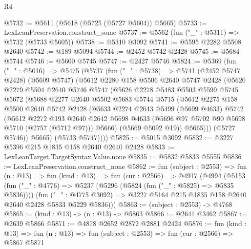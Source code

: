 \begin{lexlean}{R4}
\begin{coremodule}
@5732 := @5611 (@5618 (@5725 (@5727 @5604)) @5665)
@5733 := LexLeanPreservation.construct_some
@5737 := @5562 (fun ("_" : @5311) => @5732 (@5733 @5605))
@5738 := @5310 @3092
@5741 := @5595 @2282 @5508 @2640
@5742 := @189 @5094
@5744 := @2452 @5742 @2428
@5745 := @5684 @5744
@5746 := @5600 @5745
@5747 := @2427 @5746
@5824 := @5369
    (fun ("_" : @5016) =>
    @5475
      (@5737
        (fun ("_" : @5738) =>
        @5741
          (@2452 @5747 @2428)
          (@5609 @5747)
          (@5612
            @2280
            @158
            @5506
            @2640
            @5747
            @2428
            (@5620
              @2279
              @5504
              @2640
              @5746
              @5747
              (@5626
                @2278
                @5483
                @5503
                @5599
                @5745
                @5672
                (@5688
                  @2277
                  @2640
                  @5502
                  @5683
                  @5744
                  @5715
                  (@5612
                    @2275
                    @158
                    @5500
                    @2640
                    @5742
                    @2428
                    (@5633
                      @2274
                      @2643
                      @5499
                      (@5699 @4633)
                      @5742
                      (@5612
                        @2272
                        @193
                        @2640
                        @2642
                        @5698
                        @4633
                        (@5696 @97 @5702 @90 @5698 @5710 (@2757 (@5712 @97)))
                        @5666)
                      (@5669 @5092 @19))
                    @5665)))
              (@5727 @5746))
            @5665)
          (@5733 @5747))))
@5825 := @5015 @3092
@5832 := @3227 @5396 @215 @1835 @158 @2640 @2640 @2428
@5833 := LexLeanTarget.TargetSyntax.Value.none
@5835 := @5832 @5833 @5555
@5836 := LexLeanPreservation.construct_none
@5862 := fun (subject : @2553) =>
  fun (n : @13) =>
  fun (kind : @13) =>
  fun (cur : @2566) =>
  @4917
    (@4994
      (@5153
        (fun ("_" : @4776) => @5237 (@5296 (@5824 (fun ("_" : @5825) => @5835 @5836))))
        (fun ("_" : @4775 @3092) =>
        @3227 @5164 @215 @1835 @158 @2640 @2640 @2428 @5833 @5229 @5836)))
@5863 := (subject : @2553) -> @4768
@5865 := (kind : @13) -> (n : @13) -> @5863
@5866 := @2641 @3462
@5867 := @2639 @5866
@5871 := @4878 @2652 @2872 @2881 @2424
@5876 := fun (kind : @13) =>
  fun (n : @13) => fun (subject : @2553) => fun (cur : @2566) => @5867 @5871

\end{coremodule}
\end{lexlean}
